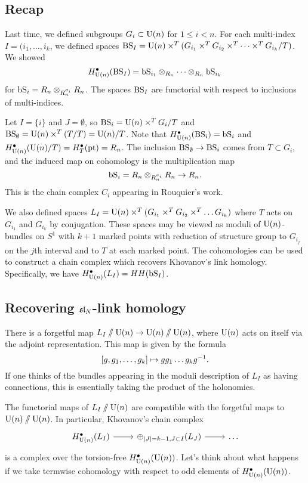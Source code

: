 \subsection{Recap}

Last time, we defined subgroups $G_i \subset \mathrm{U}(n)$ for $1 \leq i < n$.
For each multi-index $I = (i_1, \dots, i_k$, we defined spaces $\mathrm{BS}_I = \mathrm{U}(n) \times^T (G_{i_1} \times^T G_{i_2} \times^T \dots \times^T G_{i_k} / T)$.
We showed
\[
	H^\bullet_{\mathrm{U}(n)}(\mathrm{BS}_I) = \mathrm{bS}_{i_1} \otimes_{R_n} \dots \otimes_{R_n} \mathrm{bS}_{i_k}
\]
for $\mathrm{bS}_i = R_n \otimes_{R_n^{\sigma_i}} R_n$.
The spaces $\mathrm{BS}_I$ are functorial with respect to inclusions of multi-indices.

\begin{ex}
	Let $I = \{ i \}$ and $J = \emptyset$, so $\mathrm{BS}_i = \mathrm{U}(n) \times^T G_i / T$ and $\mathrm{BS}_\emptyset = \mathrm{U}(n) \times^T (T / T) = \mathrm{U}(n) / T$.
	Note that $H^\bullet_{\mathrm{U}(n)}(\mathrm{BS}_i) = \mathrm{bS}_i$ and $H^\bullet_{\mathrm{U}(n)}(\mathrm{U}(n) / T) = H^\bullet_T(\operatorname{pt}) = R_n$.
	The inclusion $\mathrm{BS}_\emptyset \to \mathrm{BS}_i$ comes from $T \subset G_i$, and the induced map on cohomology is the multiplication map
	\[
		\mathrm{bS}_i = R_n \otimes_{R_n^{\sigma_i}} R_n \to R_n.
	\]
	This is the chain complex $C_i$ appearing in Rouquier's work.
\end{ex}

We also defined spaces $L_I = \mathrm{U}(n) \times^T (G_{i_1} \times^T G_{i_2} \times^T \dots G_{i_k})$ where $T$ acts on $G_{i_1}$ and $G_{i_k}$ by conjugation.
These spaces may be viewed as moduli of $\mathrm{U}(n)$-bundles on $S^1$ with $k + 1$ marked points with reduction of structure group to $G_{i_j}$ on the $j$th interval and to $T$ at each marked point.
The cohomologies can be used to construct a chain complex which recovers Khovanov's link homology.
Specifically, we have $H^\bullet_{\mathrm{U}(n)}(L_I) = HH(\mathrm{bS}_I)$.

\subsection{Recovering $\mathfrak{sl}_N$-link homology}

There is a forgetful map $L_I \mathbin{/\mkern-6mu/} \mathrm{U}(n) \to \mathrm{U}(n) \mathbin{/\mkern-6mu/} \mathrm{U}(n)$, where $\mathrm{U}(n)$ acts on itself via the adjoint representation.
This map is given by the formula
\[
	[g, g_1, \dots, g_k] \mapsto g g_1 \dots g_k g^{-1}.
\]
If one thinks of the bundles appearing in the moduli description of $L_I$ as having connections, this is essentially taking the product of the holonomies.

The functorial maps of $L_I \mathbin{/\mkern-6mu/} \mathrm{U}(n)$ are compatible with the forgetful maps to $\mathrm{U}(n) \mathbin{/\mkern-6mu/} \mathrm{U}(n)$.
In particular, Khovanov's chain complex
\[
	\begin{tikzcd}
		H^\bullet_{\U(n)}(L_I) \rar & \oplus_{\abs{J} = k-1, J \subset I}(L_J) \rar & \dots 
	\end{tikzcd}
\]
is a complex over the torsion-free $H^\bullet_{\mathrm{U}(n)}(\mathrm{U}(n))$.
Let's think about what happens if we take termwise cohomology with respect to odd elements of $H^\bullet_{\mathrm{U}(n)}(\mathrm{U}(n))$.

